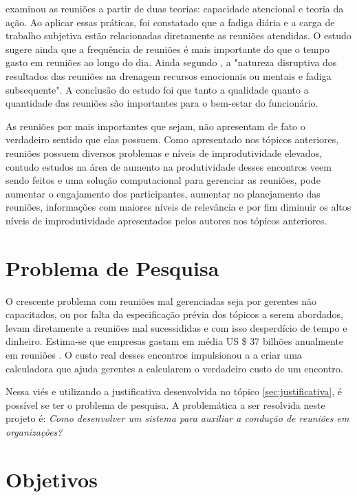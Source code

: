 \cite{rogelberg} examinou as reuniões a partir de duas teorias: capacidade atencional e teoria da ação. Ao aplicar essas práticas, foi constatado que a fadiga diária e a carga de trabalho subjetiva estão relacionadas diretamente as reuniões atendidas. O estudo sugere ainda que a frequência de reuniões é mais importante do que o tempo gasto em reuniões ao longo do dia. Ainda segundo \cite{rogelberg}, a "natureza disruptiva dos resultados das reuniões na drenagem recursos emocionais ou mentais e fadiga subsequente". A conclusão do estudo foi que tanto a qualidade quanto a quantidade das reuniões são importantes para o bem-estar do funcionário. 

As reuniões por mais importantes que sejam, não apresentam de fato o verdadeiro sentido que elas possuem. Como apresentado nos tópicos anteriores, reuniões possuem diversos problemas e níveis de improdutividade elevados, contudo estudos na área de aumento na produtividade desses encontros veem sendo feitos e uma solução computacional para gerenciar as reuniões, pode aumentar o engajamento dos participantes, aumentar no planejamento das reuniões, informações com maiores níveis de relevância e por fim diminuir os altos níveis de improdutividade apresentados pelos autores nos tópicos anteriores.

\section{Problema de Pesquisa}
\label{sec:problema_de_pesquisa}

O crescente problema com reuniões mal gerenciadas seja por gerentes não capacitados, ou por falta da especificação prévia dos tópicos a serem abordados, levam diretamente a reuniões mal sucessididas e com isso desperdício de tempo e dinheiro. Estima-se que empresas gastam em média US \$ 37 bilhões anualmente em reuniões \cite{baer}. O custo real desses encontros impulsionou a \cite{harvard} a criar uma calculadora que ajuda gerentes a calcularem o verdadeiro custo de um encontro.

Nessa viés e utilizando a justificativa desenvolvida no tópico \ref{sec:justificativa}, é possível se ter o problema de pesquisa. A problemática a ser resolvida neste projeto é: \textit{Como desenvolver um sistema para auxiliar a condução de reuniões em organizações?}

\section{Objetivos}
\label{sec:objetivos}

